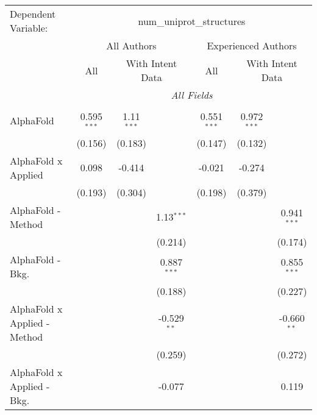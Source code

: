 \begingroup
\centering
\begin{tabular}{lcccccc}
   \tabularnewline \midrule \midrule
   Dependent Variable: & \multicolumn{6}{c}{num\_uniprot\_structures}\\
 & \multicolumn{3}{c}{All Authors} & \multicolumn{3}{c}{Experienced Authors} \\
\cmidrule(lr){2-4} \cmidrule(lr){5-7}
 & \multicolumn{1}{c}{All} & \multicolumn{2}{c}{With Intent Data} & \multicolumn{1}{c}{All} & \multicolumn{2}{c}{With Intent Data} \\
\cmidrule(lr){2-2} \cmidrule(lr){3-4} \cmidrule(lr){5-5} \cmidrule(lr){6-7}
 & \multicolumn{6}{c}{\textit{All Fields}} \\ \\
   AlphaFold                      & 0.595$^{***}$ & 1.11$^{***}$ &               & 0.551$^{***}$ & 0.972$^{***}$ &   \\   
                                  & (0.156)       & (0.183)      &               & (0.147)       & (0.132)       &   \\   
   AlphaFold x Applied            & 0.098         & -0.414       &               & -0.021        & -0.274        &   \\   
                                  & (0.193)       & (0.304)      &               & (0.198)       & (0.379)       &   \\   
   AlphaFold - Method             &               &              & 1.13$^{***}$  &               &               & 0.941$^{***}$\\   
                                  &               &              & (0.214)       &               &               & (0.174)\\   
   AlphaFold - Bkg.               &               &              & 0.887$^{***}$ &               &               & 0.855$^{***}$\\   
                                  &               &              & (0.188)       &               &               & (0.227)\\   
   AlphaFold x Applied - Method   &               &              & -0.529$^{**}$ &               &               & -0.660$^{**}$\\   
                                  &               &              & (0.259)       &               &               & (0.272)\\   
   AlphaFold x Applied - Bkg.     &               &              & -0.077        &               &               & 0.119\\   

\end{tabular}
